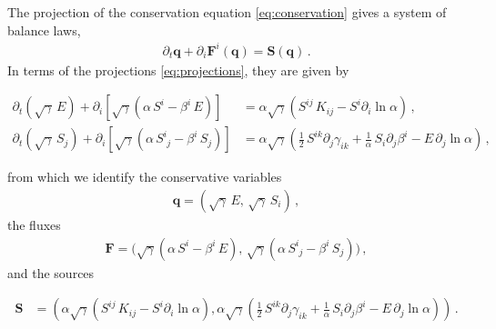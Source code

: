 \documentclass[prd,aps,twocolumn,floats,floatfix,nofootinbib,superscriptaddress] {revtex4-1}
\begin{document}
 
The projection of the conservation equation \eqref{eq:conservation} gives a system of balance laws,
\begin{align}
    \partial_t\mathbf{q} +\partial_i\mathbf{F}^i(\mathbf{q})=\mathbf{S}(\mathbf{q})\,. \label{eq:balance_law}
\end{align}
In terms of the projections \eqref{eq:projections}, they are given by
\begin{widetext}
\begin{align}
\partial_t(\sqrt{\gamma}\,E)+\partial_i[\sqrt{\gamma}(\alpha\,S^i - \beta^i\,E)]&=\alpha\sqrt{\gamma}(S^{ij}\,K_{ij} - S^i\partial_i\ln\alpha)\,,\label{eq:eq_E}\\
\partial_t(\sqrt{\gamma}\,S_j)+\partial_i[\sqrt{\gamma}(\alpha\,S^i_{\phantom{i}j}-\beta^i\,S_j)]&=\alpha\sqrt{\gamma}\left(\tfrac{1}{2}\,S^{ik}\partial_j\gamma_{ik}+\tfrac{1}{\alpha}\,S_i\partial_j \beta^i-E\,\partial_j\ln\alpha\right)\,, \label{eq:eq_Si}
\end{align}
\end{widetext}
from which we identify the conservative variables
\begin{align}
    \mathbf{q}=(\sqrt{\gamma}\,E,\,\sqrt{\gamma}\,S_i)\,,
\end{align}
the fluxes
\begin{align*}
    \mathbf{F}=\big(\sqrt{\gamma}(\alpha\,S^i - \beta^i\,E),\,\sqrt{\gamma}(\alpha\,S^i_{\phantom{i}j}-\beta^i\,S_j)\big)\,,
\end{align*}
and the sources
\begin{widetext}
\begin{align*}
    \mathbf{S} &= \left(\alpha\sqrt{\gamma}(S^{ij}\,K_{ij} - S^i\partial_i\ln\alpha),\alpha\sqrt{\gamma}\left(\tfrac{1}{2}\,S^{ik}\partial_j\gamma_{ik}+\tfrac{1}{\alpha}\,S_i\partial_j \beta^i-E\,\partial_j\ln\alpha\right)\right)\,.
\end{align*}    
\end{widetext}
\end{document}
